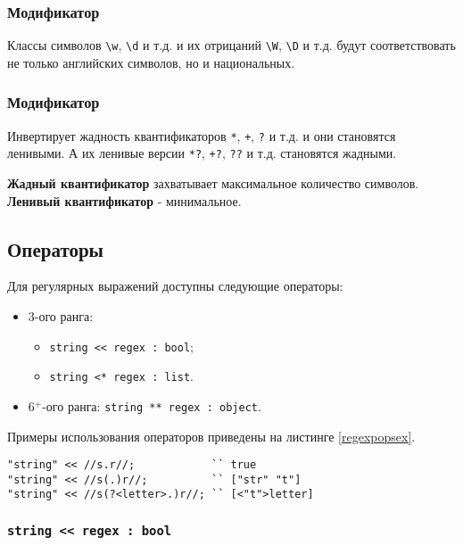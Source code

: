 \documentclass[a4paper, 14pt]{extarticle}
\newenvironment{icItems}
	{ \begin{itemize} [noitemsep,nolistsep] }
	{ \end{itemize} }
\begin{document}
\subsubsection{Модификатор }

Классы символов \lstinline|\w|, \lstinline|\d| и т.д. и их отрицаний \lstinline|\W|, \lstinline|\D| и т.д. будут соответствовать не только английских символов, но и национальных.

\subsubsection{Модификатор }

Инвертирует жадность квантификаторов \lstinline|*|, \lstinline|+|, \lstinline|?| и т.д. и они становятся ленивыми. А их ленивые версии \lstinline|*?|, \lstinline|+?|, \lstinline|??| и т.д. становятся жадными.

{\bf Жадный квантификатор} захватывает максимальное количество символов. {\bf Ленивый квантификатор} - минимальное.

\subsection{Операторы}

Для регулярных выражений доступны следующие операторы:
\begin{icItems}
\item
	3-ого ранга:
	\begin{icItems}
	\item
		\lstinline|string << regex : bool|;
	\item
		\lstinline|string <* regex : list|.
	\end{icItems}

\item 
	6$^+$-ого ранга: \lstinline|string ** regex : object|.
\end{icItems}

Примеры использования операторов приведены на листинге \ref{regexpopsex}.

\begin{lstlisting}[caption=Операторы регулярных выражений, label=regexpopsex]
"string" << //s.r//;            `` true
"string" << //s(.)r//;          `` ["str" "t"]
"string" << //s(?<letter>.)r//; `` [<"t">letter]
\end{lstlisting}

\subsubsection{\lstinline|string << regex : bool|}
\end{document}
